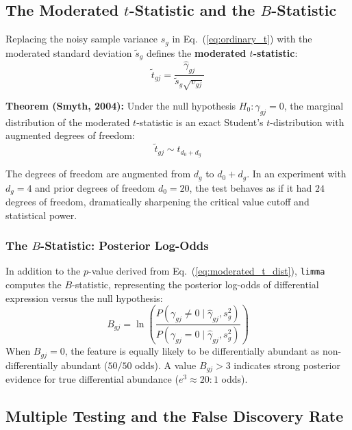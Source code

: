 \documentclass[11pt,twoside,openright]{book}
\begin{document}
\subsection{The Moderated \texorpdfstring{$t$}{t}-Statistic and the \texorpdfstring{$B$}{B}-Statistic}

Replacing the noisy sample variance $s_g$ in Eq.~(\ref{eq:ordinary_t}) with the moderated standard deviation $\tilde{s}_g$ defines the \textbf{moderated $t$-statistic}:
\begin{equation}
\tilde{t}_{gj} = \frac{\hat{\gamma}_{gj}}{\tilde{s}_g \sqrt{v_{gj}}}
\label{eq:moderated_t}
\end{equation}

\noindent
\textbf{Theorem (Smyth, 2004):} Under the null hypothesis $H_0: \gamma_{gj} = 0$, the marginal distribution of the moderated $t$-statistic is an exact Student's $t$-distribution with augmented degrees of freedom:
\begin{equation}
\tilde{t}_{gj} \sim t_{d_0 + d_g}
\label{eq:moderated_t_dist}
\end{equation}

The degrees of freedom are augmented from $d_g$ to $d_0 + d_g$. In an experiment with $d_g = 4$ and prior degrees of freedom $d_0 = 20$, the test behaves as if it had $24$ degrees of freedom, dramatically sharpening the critical value cutoff and statistical power.

\subsubsection{The \texorpdfstring{$B$}{B}-Statistic: Posterior Log-Odds}
In addition to the $p$-value derived from Eq.~(\ref{eq:moderated_t_dist}), \texttt{limma} computes the $B$-statistic, representing the posterior log-odds of differential expression versus the null hypothesis:
\begin{equation}
B_{gj} = \ln \left( \frac{P(\gamma_{gj} \neq 0 \mid \hat{\gamma}_{gj}, s_g^2)}{P(\gamma_{gj} = 0 \mid \hat{\gamma}_{gj}, s_g^2)} \right)
\label{eq:b_statistic}
\end{equation}
When $B_{gj} = 0$, the feature is equally likely to be differentially abundant as non-differentially abundant ($50/50$ odds). A value $B_{gj} > 3$ indicates strong posterior evidence for true differential abundance ($e^3 \approx 20:1$ odds).

\subsection{Multiple Testing and the False Discovery Rate}
\end{document}

